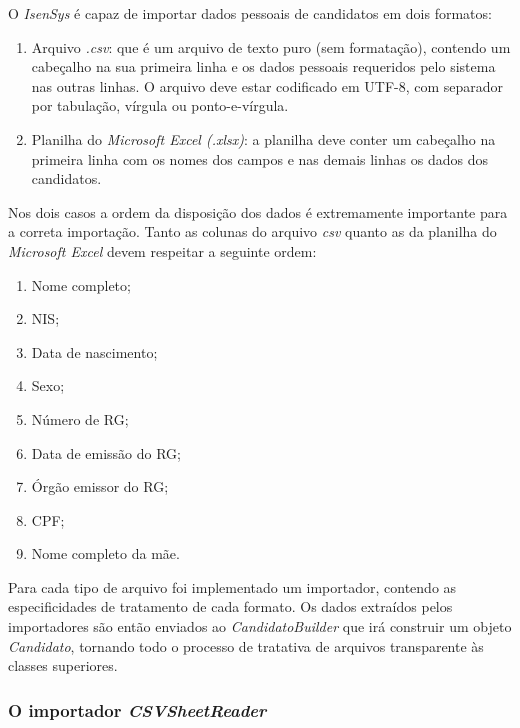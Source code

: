 \documentclass[
	12pt,			%
	openright,		%
	oneside,	
	a4paper,		%
	english,		%
	brazil			%
]{abntex2/abntex2}  %
\begin{document}
	O \textit{IsenSys} é capaz de importar dados pessoais de candidatos em dois formatos:
	
	\begin{enumerate}
		
		\item Arquivo \textit{.csv}: que é um arquivo de texto puro (sem formatação), contendo um cabeçalho na sua primeira linha e os dados pessoais requeridos pelo sistema nas outras linhas. O arquivo deve estar codificado em UTF-8, com separador por tabulação, vírgula ou ponto-e-vírgula.
		
		\item Planilha do \textit{Microsoft Excel (.xlsx)}: a planilha deve conter um cabeçalho na primeira linha com os nomes dos campos e nas demais linhas os dados dos candidatos.
		
	\end{enumerate}

	Nos dois casos a ordem da disposição dos dados é extremamente importante para a correta importação. Tanto as colunas do arquivo \textit{csv} quanto as da planilha do \textit{Microsoft Excel} devem respeitar a seguinte ordem:
	
	\begin{enumerate}
		
		\item Nome completo;
		\item NIS;
		\item Data de nascimento;
		\item Sexo;
		\item Número de RG;
		\item Data de emissão do RG;
		\item Órgão emissor do RG;
		\item CPF;
		\item Nome completo da mãe.
		
	\end{enumerate}
	
	Para cada tipo de arquivo foi implementado um importador, contendo as especificidades de tratamento de cada formato. Os dados extraídos pelos importadores são então enviados ao \textit{CandidatoBuilder} que irá construir um objeto \textit{Candidato}, tornando todo o processo de tratativa de arquivos transparente às classes superiores.
	
	\subsubsection{O importador \textit{CSVSheetReader}}
	
\end{document}
